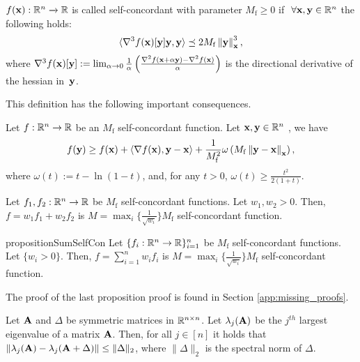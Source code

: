 
\begin{definition} \label{ass:self_con}
    $f({\mathbf{x}}) : \mathbb{R}^n \xrightarrow{} \mathbb{R}$ is called self-concordant with parameter $M_{\mathrm{f}} \geq 0$ if $~\forall {\mathbf{x}},{\mathbf{y}}\in \mathbb{R}^n$ the following holds:
    \begin{align}
        \langle \nabla^3 f({\mathbf{x}})[{\mathbf{y}}]{\mathbf{y}}, {\mathbf{y}} \rangle  \preceq 2M_{\mathrm{f}} \left\Vert{\mathbf{y}}\right\Vert_{{\mathbf{x}}}^3, \nonumber
    \end{align}
    where $\nabla^3 f({\mathbf{x}})[{\mathbf{y}}] := \lim_{\alpha\rightarrow 0} \frac{1}{\alpha}\left(\frac{\nabla^2 f({\mathbf{x}}+\alpha {\mathbf{y}}) - \nabla^2 f({\mathbf{x}})}{\alpha}\right)$ is the directional derivative of the hessian in~${\mathbf{y}}$.
\end{definition}

This definition has the following important consequences.
\begin{lemma}\label{lemma:self_con_consequences}
Let $f:\mathbb{R}^n \rightarrow \mathbb{R}$ be an $M_{\mathrm{f}}$ self-concordant function. Let ${\mathbf{x}}, {\mathbf{y}} \in \mathbb{R}^n$ , we have
$$
f({\mathbf{y}}) \geq f({\mathbf{x}}) + \langle \nabla f({\mathbf{x}}), {\mathbf{y}}  - {\mathbf{x}} \rangle + \frac{1}{M_{\mathrm{f}}^2} \omega\left(M_{\mathrm{f}}\left\Vert{\mathbf{y}}-{\mathbf{x}}\right\Vert_{\mathbf{x}} \right),
$$
where $\omega(t) := t-\ln(1-t)$, and, for any $t>0$, $\omega(t)\geq \frac{t^2}{2(1+t)}$.
\end{lemma}
\begin{lemma}\label{lemma:sum_of_self_con}
    Let $f_1,f_2 : \mathbb{R}^n \to \mathbb{R}$ be $M_{\mathrm{f}}$ self-concordant functions. Let $w_1,w_2 > 0$. Then, $f=w_1 f_1+ w_2 f_2$ is $M = \max_i \{ \frac{1}{\sqrt{w_i}} \} M_{\mathrm{f}}$ self-concordant function.
\end{lemma}
\begin{restatable}{proposition}{SumSelfCon} \label{prop:sun_of_self_con}
    Let $\{ f_i: \mathbb{R}^n \to \mathbb{R} \}_{i=1}^{n} $ be $M_{\mathrm{f}}$ self-concordant functions. Let $\{w_i > 0\}$. Then, $f= \sum_{i=1}^{n} w_i f_i$ is $M = \max_i \{ \frac{1}{\sqrt{w_i}} \} M_{\mathrm{f}}$ self-concordant function.
\end{restatable}
The proof of the last proposition proof is found in Section \ref{app:missing_proofs}.

\begin{theorem}\label{thm:weyls} Let ${\mathbf{A}}$ and $\Delta$ be symmetric matrices in $\mathbb{R}^{n \times n}$. Let $\lambda_j({\mathbf{A}})$ be the $j^{th}$ largest eigenvalue of a matrix ${\mathbf{A}}$. Then, for all $j\in [n]$ it holds that $\| \lambda_j({\mathbf{A}}) - \lambda_j({\mathbf{A}}+\Delta) \| \leq \| \Delta\|_2$, where $\| \Delta\|_2$ is the spectral norm of $\Delta$.
\end{theorem}

